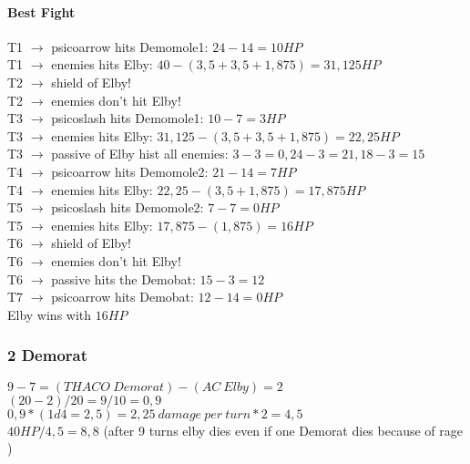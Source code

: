 \paragraph*{Best Fight\\}
T1 $\rightarrow$ psicoarrow hits Demomole1: $24-14 = 10 HP$\\
T1 $\rightarrow$ enemies hits Elby: $40 - (3,5+3,5+1,875) = 31,125 HP$\\
T2 $\rightarrow$ shield of Elby!\\
T2 $\rightarrow$ enemies don’t hit Elby!\\
T3 $\rightarrow$ psicoslash hits Demomole1: $10 - 7 = 3 HP$\\
T3 $\rightarrow$ enemies hits Elby: $31,125 - (3,5+3,5+1,875) = 22,25 HP$\\
T3 $\rightarrow$ passive of Elby hist all enemies: $3 - 3 = 0, 24 - 3 = 21, 18 - 3 = 15$\\
T4 $\rightarrow$ psicoarrow hits Demomole2: $21-14 = 7 HP$\\
T4 $\rightarrow$ enemies hits Elby: $22,25 - (3,5+1,875) = 17,875 HP$\\
T5 $\rightarrow$ psicoslash hits Demomole2: $7 - 7 = 0 HP$\\
T5 $\rightarrow$ enemies hits Elby: $17,875 - (1,875) = 16 HP$\\
T6 $\rightarrow$ shield of Elby!\\
T6 $\rightarrow$ enemies don’t hit Elby!\\
T6 $\rightarrow$ passive hits the Demobat: $15 - 3 = 12$\\
T7 $\rightarrow$ psicoarrow hits Demobat: $12-14 = 0 HP$\\
Elby wins with $16 HP$

\subsubsection*{2 Demorat}
$9-7 = (THACO\:Demorat) - (AC\:Elby) = 2$\\
$(20-2)/20 =9/10 = 0,9$\\
$0,9 * (1d4 = 2,5) = 2,25\:damage\:per\:turn * 2 = 4,5$\\
$40 HP / 4,5 = 8,8$ (after 9 turns elby dies even if one Demorat dies because of rage )

